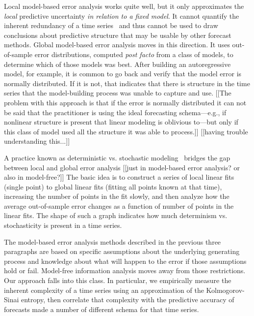 Local model-based error analysis works quite well, but it only
approximates the \emph{local} predictive uncertainty \emph{in relation
  to a fixed model}.  It cannot quantify the inherent redundancy of a
time series~\cite{crutchfield2003} and thus cannot be used to draw
conclusions about predictive structure that may be usable by other
forecast methods.
%
%
Global model-based error analysis moves in this direction.  It uses
out-of-sample error distributions, computed {\sl post facto} from a
class of models, to determine which of those models was best.  After
building an autoregressive model, for example, it is common to go back
and verify that the model error is normally distributed.  If it is
not, that indicates that there is structure in the time series that
the model-building process was unable to capture and use.
{\color{red} [[The problem with this approach is that if the error is
      normally distributed it can not be said that the practitioner is
      using the ideal forecasting schema---e.g., if nonlinear
      structure is present that linear modeling is oblivious to---but
      only if this class of model used all the structure it was able
      to process.]]  [[having trouble understanding this...]]}

A practice known as deterministic vs. stochastic
modeling~\cite{Casdagli92dvsplots, weigend-book} bridges the gap
between local and global error analysis {\color{red} [[just in
      model-based error analysis?  or also in model-free?]]}  The
basic idea is to construct a series of local linear fits (single
point) to global linear fits (fitting all points known at that time),
increasing the number of points in the fit slowly, and then analyze
how the average out-of-sample error changes as a function of number of
points in the linear fits. The shape of such a graph indicates how
much determinism vs. stochasticity is present in a time series.

The model-based error analysis methods described in the previous three
paragraphs are based on specific assumptions about the underlying
generating process and knowledge about what will happen to the error
if those assumptions hold or fail.  Model-free information analysis
moves away from those restrictions.  Our approach falls into this
class.  In particular, we empirically measure the inherent complexity
of a time series using an approximation of the Kolmogorov-Sinai
entropy, then correlate that complexity with the predictive accuracy
of forecasts made a number of different schema for that time series.

